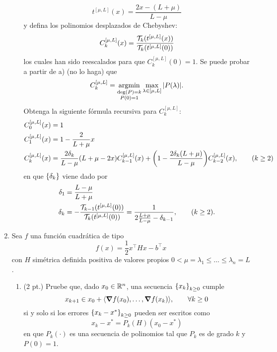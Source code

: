 \documentclass{article}
\begin{document}
\begin{enumerate}
\begin{enumerate}
        \[t^{[\mu, L]}(x) = \frac{2x - (L+\mu)}{L-\mu}\]
        y defina los polinomios desplazados de Chebyshev:
        \[C_k^{[\mu, L]}(x) = \frac{\mathcal{T}_k(t^{[\mu, L]}(x))}{\mathcal{T}_k(t^{[\mu, L]}(0))}\]
        los cuales han sido reescalados para que \(C_k^{[\mu, L]}(0) = 1\). Se puede probar a partir de a) (no lo haga) que
        \[C_k^{[\mu, L]} = \operatorname*{argmin}_{\substack{\deg(P) = k \\ P(0) = 1}} \max_{\lambda \in [\mu, L]} |P(\lambda)|.\]
        Obtenga la siguiente fórmula recursiva para \(C_k^{[\mu, L]}\):
        \begin{align*}
            C_0^{[\mu, L]}(x) &= 1 \\
            C_1^{[\mu, L]}(x) &= 1 - \frac{2}{L + \mu}x \\
            C_k^{[\mu, L]}(x) &= \frac{2\delta_k}{L - \mu}(L + \mu - 2x) C_{k-1}^{[\mu, L]}(x) + \qty(1 - \frac{2 \delta_k(L + \mu)}{L - \mu}) C_{k-2}^{[\mu, L]}(x), \qquad (k \geq 2)
        \end{align*}
        en que \(\qty{\delta_k}\) viene dado por
        \begin{align*}
            \delta_1 &= \frac{L - \mu}{L + \mu} \\
            \delta_k &= - \frac{\mathcal{T}_{k-1}(t^{[\mu, L]}(0))}{\mathcal{T}_{k}(t^{[\mu, L]}(0))} = \frac{1}{2\frac{L+\mu}{L-\mu} - \delta_{k-1}}, \qquad (k \geq 2).
        \end{align*}
    \end{enumerate}
    \item Sea \(f\) una función cuadrática de tipo
    \begin{equation} \label{function-form}
        f(x) = \frac{1}{2}x^\top H x - b^\top x
    \end{equation}
    con \(H\) simétrica definida positiva de valores propios \(0 < \mu = \lambda_1 \leq \dots \leq \lambda_n = L\).
    \begin{enumerate}
        \item (2 pt.) Pruebe que, dado \(x_0 \in \mathbb{R}^n\), una secuencia \(\qty{x_k}_{k \geq 0}\) cumple
        \begin{equation} \label{iteration-form}
            x_{k+1} \in x_0 + \langle \grad f(x_0), \dots, \grad f(x_k) \rangle, \qquad \forall k \geq 0
        \end{equation}
        si y solo si los errores \(\qty{x_k - x^*}_{k \geq 0}\) pueden ser escritos como
        \[x_k - x^* = P_k(H)(x_0 - x^*)\]
        en que \(P_k(\cdot)\) es una secuencia de polinomios tal que \(P_k\) es de grado \(k\) y \(P(0) = 1\).


\end{enumerate}
\end{enumerate}
\end{document}
